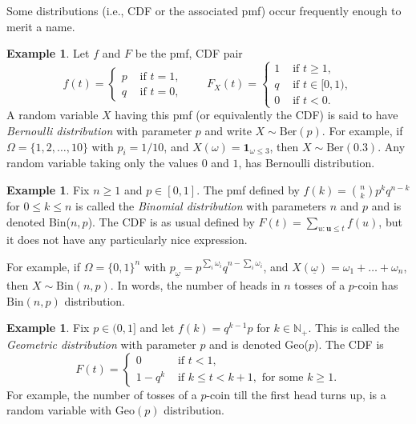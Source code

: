 \documentclass[preprint,  11pt]{amsart}
\theoremstyle{plain} %
\theoremstyle{definition} %
\newtheorem{example}[theorem]{Example}
\begin{document}
Some distributions (i.e., CDF or the associated pmf) occur frequently enough to merit a name.

\begin{example} Let $f$ and $F$ be the pmf, CDF pair 
$$
f(t)=\begin{cases}p & \mbox{ if }t=1, \\ q & \mbox{ if }t=0, \end{cases} \qquad F_{X}(t)=\begin{cases} 1 &\mbox{ if } t\ge 1, \\ q & \mbox{ if }t\in [0,1), \\ 0 & \mbox{ if }t< 0. \end{cases}
$$ 
A random variable $X$ having this pmf (or equivalently the CDF) is said to have {\em Bernoulli distribution} with parameter $p$ and  write $X\sim \mbox{Ber}(p)$. For example, if $\Omega=\{1,2,\ldots ,10\}$ with $p_{i}=1/10$, and $X(\omega)={\mathbf 1}_{\omega\le 3}$, then $X\sim \mbox{Ber}(0.3)$. Any random variable taking only the values $0$ and $1$, has Bernoulli distribution.
\end{example}

\begin{example}  Fix $n\ge 1$ and $p\in [0,1]$. The pmf defined by $f(k)=\binom{n}{k}p^{k}q^{n-k}$ for $0\le k\le n$ is called the {\em Binomial  distribution} with parameters $n$ and $p$ and is denoted Bin($n,p$). The CDF is as usual defined by $F(t)=\sum_{u:\mathbf{u}\le t}f(u)$, but it does not have any particularly nice expression. 

For example, if $\Omega=\{0,1\}^{n}$ with $p_{\underline{\omega}}=p^{\sum_{i}\omega_{i}}q^{n-\sum_{i}\omega_{i}}$, and $X(\underline{\omega})=\omega_{1}+\ldots +\omega_{n}$, then $X\sim \mbox{Bin}(n,p)$. In words, the number of heads in $n$ tosses of a $p$-coin has $\mbox{Bin}(n,p)$ distribution.
\end{example}

\begin{example} Fix $p\in (0,1]$ and let $f(k)=q^{k-1}p$ for $k\in \mathbb{N}_{+}$. This is called the {\em Geometric  distribution} with parameter $p$ and is denoted Geo($p$). The CDF is
$$
F(t) = \begin{cases}
0 & \mbox{ if } t<1, \\
1-q^{k} & \mbox{ if } k\le t<k+1, \mbox{ for some }k\ge 1.
\end{cases}
$$
For example, the number of tosses of a $p$-coin till the first head turns up, is a random variable with $\mbox{Geo}(p)$ distribution.
\end{example} 
\end{document}
